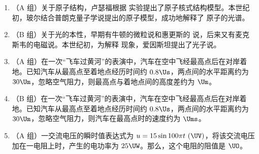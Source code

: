 \documentclass[\gkver]{gaokaozhenti}
\begin{document}
\begin{enumerate}
\item
（A 组）关于原子结构，卢瑟福根据  实验提出了原子核式结构模型。本世纪初，玻尔结合普朗克量子学说提出的原子模型，成功地解释了  原子的光谱。


\item
（B 组）关于光的本性，早期有牛顿的微粒说和惠更斯的  说，后来又有麦克斯韦的电磁说。本世纪初，为解释  现象，爱因斯坦提出了光子说。


\item
（A 组）在一次“飞车过黄河”的表演中，汽车在空中飞经最高点后在对岸着地。已知汽车从最高点至着地点经历时间约 $0.8\Us$，两点间的水平距离约为 $30\Um$，忽略空气阻力，则最高点与着地点间的高度差约为  $\Um$。


\item
（B 组）在一次“飞车过黄河”的表演中，汽车在空中飞经最高点后在对岸着地。已知汽车从最高点至着地点经历时间约 $0.8\Us$，两点间的水平距离约为 $30\Um$，忽略空气阻力，则汽车在最高点时的速度约为  $\Ums$。


\item
（A 组）一交流电压的瞬时值表达式为 $u = 15\sin 100\pi t\ (\UV)$，将该交流电压加在一电阻上时，产生的电功率为 $25\UW$。那么，这个电阻的阻值是  $\UO$。


\end{enumerate}
\end{document}
